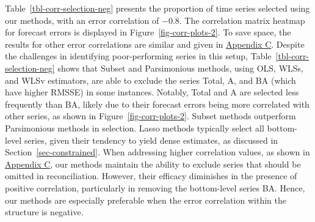 \documentclass[
  11pt]{article}
\theoremstyle{plain}
\theoremstyle{remark}
\begin{document}
Table~\ref{tbl-corr-selection-neg} presents the proportion of time
series selected using our methods, with an error correlation of
\(-0.8\). The correlation matrix heatmap for forecast errors is
displayed in Figure~\ref{fig-corr-plots-2}. To save space, the results
for other error correlations are similar and given in
\hyperref[appendix-sim2]{Appendix C}. Despite the challenges in
identifying poor-performing series in this setup,
Table~\ref{tbl-corr-selection-neg} shows that Subset and Parsimonious
methods, using OLS, WLSs, and WLSv estimators, are able to exclude the
series Total, A, and BA (which have higher RMSSE) in some instances.
Notably, Total and A are selected less frequently than BA, likely due to
their forecast errors being more correlated with other series, as shown
in Figure~\ref{fig-corr-plots-2}. Subset methods outperform Parsimonious
methods in selection. Lasso methods typically select all bottom-level
series, given their tendency to yield dense estimates, as discussed in
Section~\ref{sec-constrained}. When addressing higher correlation
values, as shown in \hyperref[appendix-sim2]{Appendix C}, our methods
maintain the ability to exclude series that should be omitted in
reconciliation. However, their efficacy diminishes in the presence of
positive correlation, particularly in removing the bottom-level series
BA. Hence, our methods are especially preferable when the error
correlation within the structure is negative.
\end{document}
